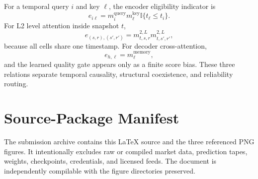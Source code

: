 \documentclass[10pt,letterpaper]{article}
\numberwithin{equation}{section}
\newcommand{\I}{\mathbb{I}}
\theoremstyle{definition}
\theoremstyle{remark}
\begin{document}
For a temporal query $i$ and key $\ell$, the encoder eligibility indicator is
\begin{equation}
e_{i\ell}=m_i^{\mathrm{query}}m_\ell^{\mathrm{key}}
\I\{t_\ell\le t_i\}.
\label{eq:temporal-eligibility}
\end{equation}
For L2 level attention inside snapshot $t$,
\begin{equation}
e_{(s,r),(s',r')}=m^{2,L}_{t,s,r}m^{2,L}_{t,s',r'},
\label{eq:level-eligibility}
\end{equation}
because all cells share one timestamp. For decoder cross-attention,
\begin{equation}
e_{h,\ell}=m_\ell^{\mathrm{memory}},
\label{eq:cross-eligibility}
\end{equation}
and the learned quality gate appears only as a finite score bias. These three
relations separate temporal causality, structural coexistence, and reliability
routing.

\section{Source-Package Manifest}

The submission archive contains this LaTeX source and the three referenced PNG
figures. It intentionally excludes raw or compiled market data, prediction
tapes, weights, checkpoints, credentials, and licensed feeds. The document is
independently compilable with the figure directories preserved.
\end{document}
